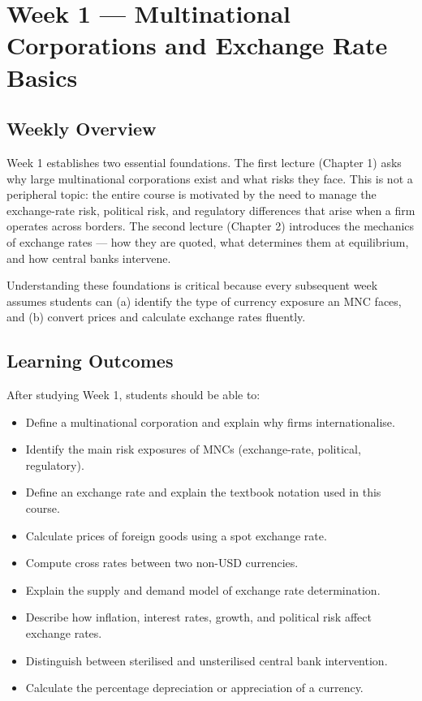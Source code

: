 \documentclass[11pt,a4paper]{article}
\begin{document}
\newpage

\section{Week 1 — Multinational Corporations and Exchange Rate Basics}

\subsection{Weekly Overview}

Week 1 establishes two essential foundations. The first lecture (Chapter 1) asks why large multinational corporations exist and what risks they face. This is not a peripheral topic: the entire course is motivated by the need to manage the exchange-rate risk, political risk, and regulatory differences that arise when a firm operates across borders. The second lecture (Chapter 2) introduces the mechanics of exchange rates — how they are quoted, what determines them at equilibrium, and how central banks intervene.

Understanding these foundations is critical because every subsequent week assumes students can (a) identify the type of currency exposure an MNC faces, and (b) convert prices and calculate exchange rates fluently.

\subsection{Learning Outcomes}

After studying Week 1, students should be able to:
\begin{itemize}
  \item Define a multinational corporation and explain why firms internationalise.
  \item Identify the main risk exposures of MNCs (exchange-rate, political, regulatory).
  \item Define an exchange rate and explain the textbook notation used in this course.
  \item Calculate prices of foreign goods using a spot exchange rate.
  \item Compute cross rates between two non-USD currencies.
  \item Explain the supply and demand model of exchange rate determination.
  \item Describe how inflation, interest rates, growth, and political risk affect exchange rates.
  \item Distinguish between sterilised and unsterilised central bank intervention.
  \item Calculate the percentage depreciation or appreciation of a currency.
\end{itemize}
\end{document}
